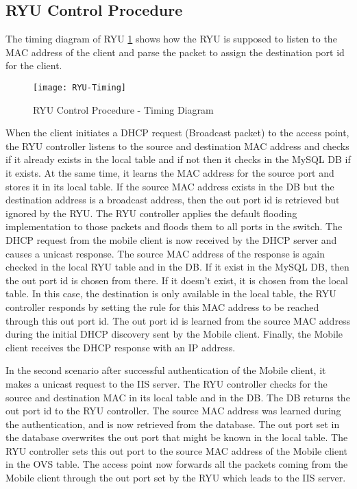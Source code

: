 \subsection{RYU Control Procedure} \label{RYU Control Procedure}
The timing diagram of RYU \ref{fig:RYU-Timing} shows how the RYU is supposed to listen to the MAC address of the client and parse the packet to assign the destination port id for the client.

\begin{figure}
	\centering
	\texttt{[image: RYU-Timing]}
	\caption {RYU Control Procedure - Timing Diagram }
	\label{fig:RYU-Timing}
	\vspace{-10pt}
\end{figure}

When the client initiates a DHCP request (Broadcast packet) to the access point, the RYU controller listens to the source and destination MAC address and checks if it already exists in the local table and if not then it checks in the MySQL DB if it exists. At the same time, it learns the MAC address for the source port and stores it in its local table. If the source MAC address exists in the DB but the destination address is a broadcast address, then the out port id is retrieved but ignored by the RYU. The RYU controller applies the default flooding implementation to those packets and floods them to all ports in the switch. The DHCP request from the mobile client is now received by the DHCP server and causes a unicast response.  The source MAC address of the response is again checked in the local RYU table and in the DB. If it exist in the MySQL DB, then the out port id is chosen from there. If it doesn't exist, it is chosen from the local table. In this case, the destination is only available in the local table, the RYU controller responds by setting the rule for this MAC address to be reached through this out port id. The out port id is learned from the source MAC address during the initial DHCP discovery sent by the Mobile client. Finally, the Mobile client receives the DHCP response with an IP address.

In the second scenario after successful authentication of the Mobile client, it makes a unicast request to the IIS server. The RYU controller checks for the source and destination MAC in its local table and in the DB. The DB returns the out port id to the RYU controller. The source MAC address was learned during the authentication, and is now retrieved from the database. The out port set in the database overwrites the out port that might be known in the local table. The RYU controller sets this out port to the source MAC address of the Mobile client in the OVS table. The access point now forwards all the packets coming from the Mobile client through the out port set by the RYU which leads to the IIS server.

